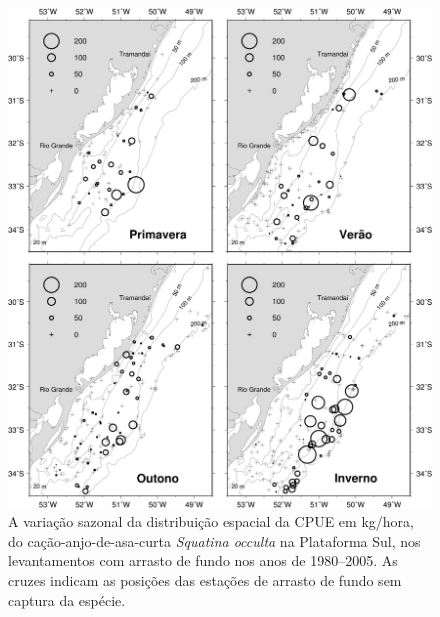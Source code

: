 \documentclass[a4paper,11pt,twoside,showtrims,onecolumn,openright,final]{memoir}
\begin{document}
\begin{figure}
\begin{center}
\includegraphics[width=\textwidth]{OCCULTA_MAPA_DISTRIBUICAO_CPUE}
\end{center}
\caption[Variação sazonal da distribuição espacial da CPUE em kg/hora, do cação-anjo-de-asa-curta \emph{Squatina occulta}]
	{A variação sazonal da distribuição espacial da CPUE em kg/hora, do cação-anjo-de-asa-curta \emph{Squatina occulta} 
	 na Plataforma Sul, nos levantamentos com arrasto de fundo nos anos de 1980--2005. 
	 As cruzes indicam as posições das estações de arrasto de fundo sem captura da espécie.}
\label{fig:occulta-mapacpue}
\end{figure}

	  
\end{document}
